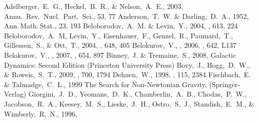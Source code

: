 \begin{thebibliography}{99}


  Adelberger,~E.~G., Heckel,~B.~R., \& Nelson,~A.~E., 2003,
  Annu.~Rev.~Nucl.~Part.~Sci., 53, 77
  Anderson,~T.~W. \& Darling,~D.~A., 1952,
  Ann.\,Math.\,Stat., 23, 193
  Beloborodov,~A.~M. \& Levin,~Y., 2004,
  \apj, 613, 224
  Beloborodov,~A.~M, Levin,~Y., Eisenhauer,~F., Genzel,~R., 
  Paumard,~T., Gillessen,~S.,
  \& Ott,~T., 2004,
  \apj, 648, 405
  Belokurov,~V., \etal, 2006,
  \apjl, 642, L137
  Belokurov,~V., \etal, 2007,
  \apj, 654, 897
  Binney,~J. \& Tremaine,~S., 2008, Galactic Dynamics: Second Edition
  (Princeton University Press)
  Bovy,~J., Hogg,~D.~W., \& Roweis,~S.~T., 2009,
  \apj, 700, 1794
  Dehnen,~W., 1998,
  \aj, 115, 2384
  Fischbach,~E. \& Talmadge,~C.~L., 1999
  The Search for Non-Newtonian Gravity,
  (Springer-Verlag)
  Giorgini,~J.~D., Yeomans,~D.~K., Chamberlin,~A.~B., Chodas,~P.~W., Jacobson,~R.~A., Keesey,~M.~S., Lieske,~J.~H., Ostro,~S.~J., Standish,~E.~M., \& Wimberly,~R.~N., 1996, 

\end{thebibliography}
